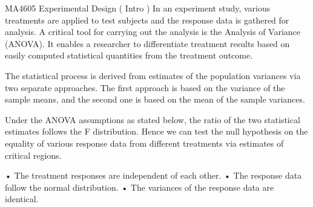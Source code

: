 MA4605 Experimental Design ( Intro )
In an experiment study, various treatments are applied to test subjects and the response data is gathered for analysis. A critical tool for carrying out the analysis is the Analysis of Variance (ANOVA). It enables a researcher to differentiate treatment results based on easily computed statistical quantities from the treatment outcome.

The statistical process is derived from estimates of the population variances via two separate approaches. The first approach is based on the variance of the sample means, and the second one is based on the mean of the sample variances. 

Under the ANOVA assumptions as stated below, the ratio of the two statistical estimates follows the F distribution. Hence we can test the null hypothesis on the equality of various response data from different treatments via estimates of critical regions.

•	The treatment responses are independent of each other.
•	The response data follow the normal distribution.
•	The variances of the response data are identical.

